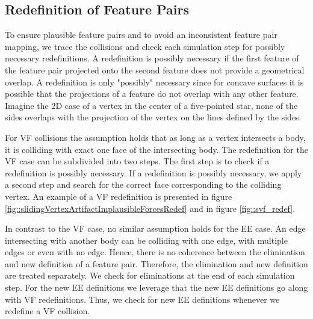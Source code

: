 \subsection{Redefinition of Feature Pairs}
\label{ss::redef}
To ensure plausible feature pairs and to avoid an inconsistent feature pair mapping, we trace the collisions and check each simulation step for possibly necessary redefinitions. A redefinition is possibly necessary if the first feature of the feature pair projected onto the second feature does not provide a geometrical overlap.
A redefinition is only "possibly" necessary since for concave surfaces it is possible that the projections of a feature do not overlap with any other feature. Imagine the 2D case of a vertex in the center of a five-pointed star, none of the sides overlaps with the projection of the vertex on the lines defined by the sides.

For VF collisions the assumption holds that as long as a vertex intersects a body, it is colliding with exact one face of the intersecting body. The redefinition for the VF case can be subdivided into two steps. The first step is to check if a redefinition is possibly necessary. If a redefinition is possibly necessary, we apply a second step and search for the correct face corresponding to the colliding vertex. 
An example of a VF redefinition is presented in figure \ref{fig::slidingVertexArtifactImplausibleForcesRedef} and in figure \ref{fig::svf_redef}.

In contrast to the VF case, no similar assumption holds for the EE case. An edge intersecting with another body can be colliding with one edge, with multiple edges or even with no edge.
Hence, there is no coherence between the elimination and new definition of a feature pair.
Therefore, the elimination and new definition are treated separately.
We check for eliminations at the end of each simulation step. For the new EE definitions we leverage that the new EE definitions go along with VF redefinitions.
Thus, we check for new EE definitions whenever we redefine a VF collision.

